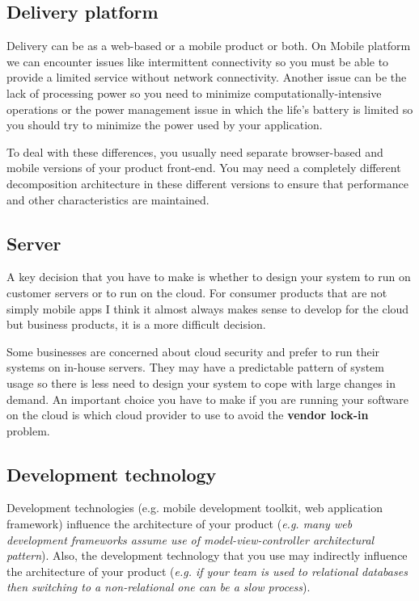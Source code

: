 \documentclass[10pt,a4paper]{report}
\newcommand*{\skippingparagraph}{\par\vspace{0.3cm}}
\begin{document}
\subsection{Delivery platform}
Delivery can be as a web-based or a mobile product or both. On Mobile platform we can encounter issues like intermittent connectivity so you must be able to provide a limited service without network connectivity.
Another issue can be the lack of processing power so you need to minimize computationally-intensive operations or the power management issue in which the life's battery is limited so you should try to minimize
the power used by your application.

To deal with these differences, you usually need separate browser-based and mobile versions of your product front-end. You may need a completely different decomposition architecture in these different
versions to ensure that performance and other characteristics are maintained.

\subsection{Server}
 A key decision that you have to make is whether to design your system to run on customer servers or to run on the cloud. For consumer products that are not simply mobile apps I think it almost always makes sense to develop for the cloud but business products, it is a more difficult decision.

Some businesses are concerned about cloud security and prefer to run their systems on in-house servers. They may have a predictable pattern of system usage so there is less need to design your system to cope with large changes in demand. An important choice you have to make if you are running your software
on the cloud is which cloud provider to use to avoid the \textbf{vendor lock-in} problem. 

\subsection{Development technology}
Development technologies (e.g. mobile development toolkit, web application framework) influence the architecture of your product (\textit{e.g. many web development frameworks assume use of model-view-controller architectural pattern}). Also, the development technology that you use may indirectly
influence the architecture of your product (\textit{e.g. if your team is used to relational databases then switching to a non-relational one can be a slow process}).
\skippingparagraph
\end{document}

